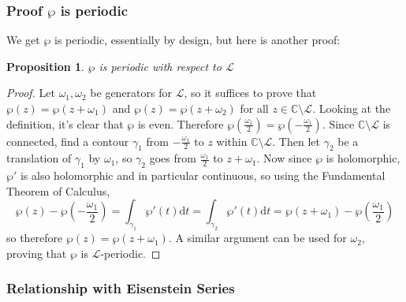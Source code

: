 \documentclass{article}
\newtheorem{prop}{Proposition}[section]
\theoremstyle{definition}
\theoremstyle{definition}
\theoremstyle{definition}
\begin{document}
\subsubsection{Proof $\wp$ is periodic}

We get $\wp$ is periodic, essentially by design, but here is another proof:

\begin{prop}$\wp$ is periodic with respect to $\mathcal L$
\end{prop}
\begin{proof}Let $\omega_1,\omega_2$ be generators for $\mathcal L$, so it suffices to prove that $\wp(z)=\wp(z+\omega_1)$ and $\wp(z)=\wp(z+\omega_2)$ for all $z\in\mathbb C\setminus\mathcal L$. Looking at the definition, it's clear that $\wp$ is even. Therefore $\wp(\frac{\omega_1}{2})=\wp(-\frac{\omega_1}{2})$. Since $\mathbb C\setminus\mathcal L$ is connected, find a contour $\gamma_1$ from $-\frac{\omega_1}{2}$ to $z$ within $\mathbb C\setminus\mathcal L$. Then let $\gamma_2$ be a translation of $\gamma_1$ by $\omega_1$, so $\gamma_2$ goes from $\frac{\omega_1}{2}$ to $z+\omega_1$. Now since $\wp$ is holomorphic, $\wp'$ is also holomorphic and in particular continuous, so using the Fundamental Theorem of Calculus,
$$\wp(z)-\wp\left(-\frac{\omega_1}2\right)=\int_{\gamma_1}\wp'(t)\mathrm{d}t=\int_{\gamma_2}\wp'(t)\mathrm{d}t=\wp(z+\omega_1)-\wp\left(\frac{\omega_1}2\right)$$
so therefore $\wp(z)=\wp(z+\omega_1)$. A similar argument can be used for $\omega_2$, proving that $\wp$ is $\mathcal L$-periodic.

    
\end{proof}

\subsubsection{Relationship with Eisenstein Series}
\end{document}
